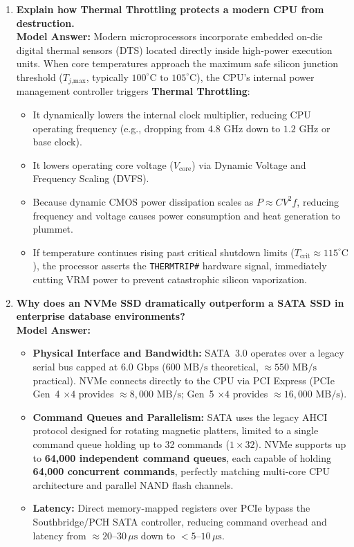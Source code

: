 \begin{enumerate}[leftmargin=*,label=\textbf{Q\arabic*.}]
    \item \textbf{Explain how Thermal Throttling protects a modern CPU from destruction.} \\
    \textbf{Model Answer:} Modern microprocessors incorporate embedded on-die digital thermal sensors (DTS) located directly inside high-power execution units. When core temperatures approach the maximum safe silicon junction threshold ($T_{j\text{,max}}$, typically $100^\circ\text{C}\text{ to }105^\circ\text{C}$), the CPU's internal power management controller triggers \textbf{Thermal Throttling}:
    \begin{itemize}
        \item It dynamically lowers the internal clock multiplier, reducing CPU operating frequency (e.g., dropping from $4.8\text{ GHz}$ down to $1.2\text{ GHz}$ or base clock).
        \item It lowers operating core voltage ($V_{\text{core}}$) via Dynamic Voltage and Frequency Scaling (DVFS).
        \item Because dynamic CMOS power dissipation scales as $P \approx C V^2 f$, reducing frequency and voltage causes power consumption and heat generation to plummet.
        \item If temperature continues rising past critical shutdown limits ($T_{\text{crit}} \approx 115^\circ\text{C}$), the processor asserts the \texttt{THERMTRIP\#} hardware signal, immediately cutting VRM power to prevent catastrophic silicon vaporization.
    \end{itemize}

    \item \textbf{Why does an NVMe SSD dramatically outperform a SATA SSD in enterprise database environments?} \\
    \textbf{Model Answer:}
    \begin{itemize}
        \item \textbf{Physical Interface and Bandwidth:} SATA~3.0 operates over a legacy serial bus capped at $6.0\text{ Gbps}$ ($600\text{ MB/s}$ theoretical, $\approx 550\text{ MB/s}$ practical). NVMe connects directly to the CPU via PCI Express (PCIe Gen~4 $\times4$ provides $\approx 8,000\text{ MB/s}$; Gen~5 $\times4$ provides $\approx 16,000\text{ MB/s}$).
        \item \textbf{Command Queues and Parallelism:} SATA uses the legacy AHCI protocol designed for rotating magnetic platters, limited to a single command queue holding up to 32 commands ($1\times 32$). NVMe supports up to \textbf{64,000 independent command queues}, each capable of holding \textbf{64,000 concurrent commands}, perfectly matching multi-core CPU architecture and parallel NAND flash channels.
        \item \textbf{Latency:} Direct memory-mapped registers over PCIe bypass the Southbridge/PCH SATA controller, reducing command overhead and latency from $\approx 20\text{--}30\,\mu\text{s}$ down to $<5\text{--}10\,\mu\text{s}$.
    \end{itemize}


\end{enumerate}
